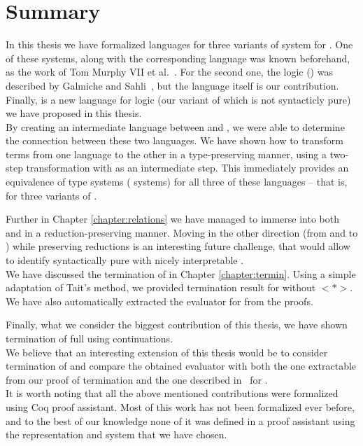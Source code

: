 \chapter{Summary} \label{chapter:summary}

In this thesis we have formalized languages for three variants of \ND{} system for \logic{}. One of these systems, \langL{} along with the corresponding language was known beforehand, as the work of Tom Murphy VII et al.~\cite{labeled}. For the second one, the logic (\logicLF{})  was described by Galmiche and Sahli~\cite{labelfree}, but the language itself is our contribution. Finally, \langHyb{} is a new language for logic \logicHyb{} (our variant of \logicLF{} which is not syntacticly pure) we have proposed in this thesis.\\

By creating an intermediate language between \langLF{} and \langL{}, we were able to determine the connection between these two languages. We have shown how to transform terms from one language to the other in a type-preserving manner, using a two-step transformation with \langHyb{} as an intermediate step. This immediately provides an equivalence of type systems (\ND{} systems) for all three of these languages -- that is, for three variants of \logic{}.

Further in Chapter \ref{chapter:relations} we have managed to immerse \langHyb{} into both \langLF{} and \langL{} in a reduction-preserving manner. Moving in the other direction (from \langL{} and \langLF{} to \langHyb{}) while preserving reductions is an interesting future challenge, that would allow to identify syntactically pure \langLF{} with nicely interpretable \langL{}.\\

We have discussed the termination of \langLF{} in Chapter \ref{chapter:termin}. Using a simple adaptation of Tait's method, we provided termination result for \langLF{} without $<*>$. We have also automatically extracted the evaluator for \nodiaLangLF{} from the proofs.

Finally, what we consider the biggest contribution of this thesis, we have shown termination of full \langLF{} using continuations.\\

We believe that an interesting extension of this thesis would be to consider termination of \langHyb{} and compare the obtained evaluator with both the one extractable from our proof of \langLF{} termination and the one described in~\cite{labeledphd} for \langL{}.\\

It is worth noting that all the above mentioned contributions were formalized using Coq proof assistant. Most of this work has not been formalized ever before, and to the best of our knowledge none of it was defined in a proof assistant using the representation and system that we have chosen.
